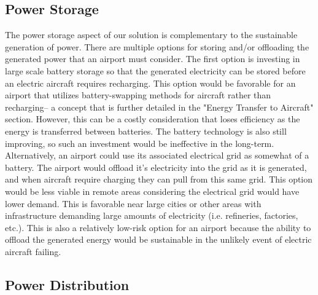 \documentclass[../main.tex]{subfiles}
\begin{document}
\subsection{Power Storage} %
The power storage aspect of our solution is complementary to the sustainable generation of power.  There are multiple options for storing and/or offloading the generated power that an airport must consider. 
The first option is investing in large scale battery storage so that the generated electricity can be stored before an electric aircraft requires recharging. This option would be favorable for an airport that utilizes battery-swapping methods for aircraft rather than recharging-- a concept that is further detailed in the "Energy Transfer to Aircraft" section. However, this can be a costly consideration that loses efficiency as the energy is transferred between batteries. The battery technology is also still improving, so such an investment would be ineffective in the long-term. 
Alternatively, an airport could use its associated electrical grid as somewhat of a battery. The airport would offload it's  electricity into the grid as it is generated, and when aircraft require charging they can pull from this same grid. This option would be less viable in remote areas considering the electrical grid would have lower demand. This is favorable near large cities or other areas with infrastructure demanding large amounts of electricity (i.e. refineries, factories, etc.). This is also a relatively low-risk option for an airport because the ability to offload the generated energy would be sustainable in the unlikely event of electric aircraft failing. 

\subsection{Power Distribution} %
\end{document}
